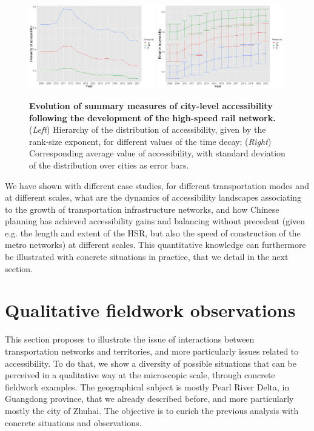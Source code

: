 \documentclass[11pt]{article}
\begin{document}
\begin{figure}
	\includegraphics[width=0.49\textwidth]{access_hierarchy.png}
	\includegraphics[width=0.49\textwidth]{access_summary.png}
	\caption{\textbf{Evolution of summary measures of city-level accessibility following the development of the high-speed rail network.} (\textit{Left}) Hierarchy of the distribution of accessibility, given by the rank-size exponent, for different values of the time decay; (\textit{Right}) Corresponding average value of accessibility, with standard deviation of the distribution over cities as error bars.\label{fig:hsraccess}}
\end{figure}

We have shown with different case studies, for different transportation modes and at different scales, what are the dynamics of accessibility landscapes associating to the growth of transportation infrastructure networks, and how Chinese planning has achieved accessibility gains and balancing without precedent (given e.g. the length and extent of the HSR, but also the speed of construction of the metro networks) at different scales. This quantitative knowledge can furthermore be illustrated with concrete situations in practice, that we detail in the next section.


\section{Qualitative fieldwork observations}


This section proposes to illustrate the issue of interactions between transportation networks and territories, and more particularly issues related to accessibility. To do that, we show a diversity of possible situations that can be perceived in a qualitative way at the microscopic scale, through concrete fieldwork examples. The geographical subject is mostly Pearl River Delta, in Guangdong province, that we already described before, and more particularly mostly the city of Zhuhai. The objective is to enrich the previous analysis with concrete situations and observations.
\end{document}

